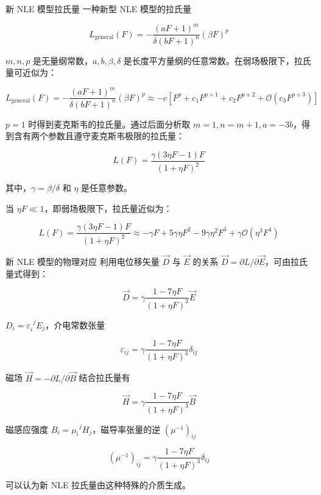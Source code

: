 \documentclass[9pt, dvipsnames]{beamer} %
\begin{document}
\begin{frame}{新 NLE 模型拉氏量}
一种新型 NLE 模型的拉氏量

$$
L_{\mathrm{general}}(F)
=-\frac{\left(aF+1 \right)^m }{\delta(bF+1)^n } \left(\beta F \right)^p
$$

$m,n,p $ 是无量纲常数，$a,b,\beta,\delta $ 是长度平方量纲的任意常数。在弱场极限下，拉氏量可近似为：

$$
L_{\mathrm{general}}(F)
=-\frac{\left(aF+1 \right)^m }{\delta(bF+1)^n } \left(\beta F \right)^p
\approx -c\left[F^p + c_1 F^{p+1} +c_2 F^{p+2}  + \mathcal{O}\left(c_3 F^{p+3} \right) \right]
$$

$p=1 $ 时得到麦克斯韦的拉氏量。通过后面分析取 $m=1,n=m+1,a=-3b $，得到含有两个参数且遵守麦克斯韦极限的拉氏量：

$$
\boxed{
L(F)
=\frac{\gamma(3\eta F - 1 )F }{(1+\eta F)^2 }
}
$$

其中，$\gamma=\beta/\delta $ 和 $\eta $ 是任意参数。

当 $\eta F\ll 1 $，即弱场极限下，拉氏量近似为：

$$
L(F)
=\frac{\gamma(3\eta F - 1 )F }{(1+\eta F)^2 } 
\approx -\gamma F + 5\gamma \eta F^2 -9\gamma \eta^2 F^3 + \gamma\mathcal{O}\left(\eta^3F^4 \right) 
$$

\end{frame}

\begin{frame}{新 NLE 模型的物理对应}
利用电位移矢量 $\vec{D} $ 与 $\vec{E} $ 的关系 $\vec{D}=\partial L/\partial \vec{E} $，可由拉氏量式得到：

$$
\vec{D}
=\gamma\frac{1-7\eta F }{(1+\eta F)^3 } \vec{E}
$$

$D_i = \varepsilon_i^{~~ j } E_j $，介电常数张量

$$
\boxed{
\varepsilon_{ij} = \gamma \frac{1-7\eta F }{(1+\eta F)^3 }\delta_{ij}
}
$$

磁场 $\vec{H}=-\partial L/\partial \vec{B} $ 结合拉氏量有

$$
\vec{H}
=\gamma \frac{1-7\eta F }{(1+\eta F)^3 } \vec{B}
$$

磁感应强度 $B_i=\mu_i^{~~j}H_j $，磁导率张量的逆 $\left(\mu^{-1} \right)_{ij} $

$$
\boxed{
\left(\mu^{-1} \right)_{ij}
=\gamma \frac{1-7\eta F }{(1+\eta F)^3 } \delta_{ij}
}
$$

可以认为新 NLE 拉氏量由这种特殊的介质生成。
\end{frame}
\end{document}
